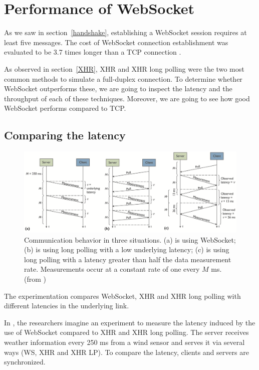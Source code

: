\documentclass[10pt,journal,compsoc]{IEEEtran}
\newcommand{\ws}{WebSocket}
\begin{document}
\section{Performance of \ws{}}

As we saw in section~\ref{handshake}, establishing a \ws{} session requires at least five messages.
The cost of \ws{} connection establishment was evaluated to be 3.7 times longer than a TCP connection \cite{performanceEvaluationOfWebsocketProtocol}.  %

As observed in section~\ref{XHR}, XHR and XHR long polling were the two most common methods to simulate a full-duplex connection.
To determine whether \ws{} outperforms these, we are going to inspect the latency and the throughput of each of these techniques.
Moreover, we are going to see how good \ws{} performs compared to TCP. %

\subsection{Comparing the latency}

\begin{figure}[!t]
    \centering
    \includegraphics[width=\textwidth]{comdisp.png}
    \caption{Communication behavior in three situations. (a) is using \ws{}; (b) is using long polling with a low underlying latency; (c) is using long polling with a latency greater than half the data measurement rate. Measurements occur at a constant rate of one every $M$ ms. (from \cite{communicationAndDIsplayingRealTimeDataWithWebSocket})}
    \label{fig:comdisp}
\end{figure}

The experimentation compares \ws{}, XHR and XHR long polling with different latencies in the underlying link.

In \cite{communicationAndDIsplayingRealTimeDataWithWebSocket}, the researchers imagine an experiment to measure the latency induced by the use of \ws{} compared to XHR and XHR long polling.
The server receives weather information every 250 ms from a wind sensor and serves it via several ways (WS, XHR and XHR LP).
To compare the latency, clients and servers are synchronized.
\end{document}
